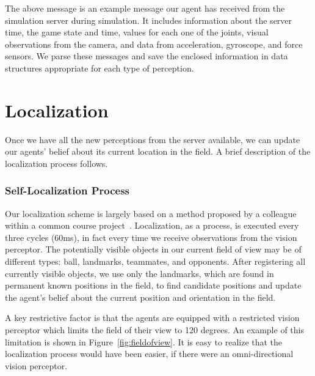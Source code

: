 \noindent
The above message is an example message our agent has received from the simulation server during simulation. It includes information about the server time, the game state and time, values for each one of the joints, visual observations from the camera, and data from acceleration, gyroscope, and force sensors. We parse these messages and save the enclosed information in data structures appropriate for each type of perception. 



\section{Localization}
Once we have all the new perceptions from the server available, we can update our agents' belief about its current location in the field. A brief description of the localization process follows.

\subsubsection*{Self-Localization Process} 

Our localization scheme is largely based on a method proposed by a colleague within a common course project~\cite{Localization}. Localization, as a process, is executed every three cycles (60ms), in fact every time we receive observations from the vision perceptor. The potentially visible objects in our current field of view may be of different types: ball, landmarks, teammates, and opponents. After registering all currently visible objects, we use only the landmarks, which are found in permanent known positions in the field, to find candidate positions and update the agent's belief about the current position and orientation in the field. 

A key restrictive factor is that the agents are equipped with a restricted vision perceptor which limits the field of their view to 120 degrees. An example of this limitation is shown in Figure~\ref{fig:fieldofview}. It is easy to realize that the localization process would have been easier, if there were an omni-directional vision perceptor.

